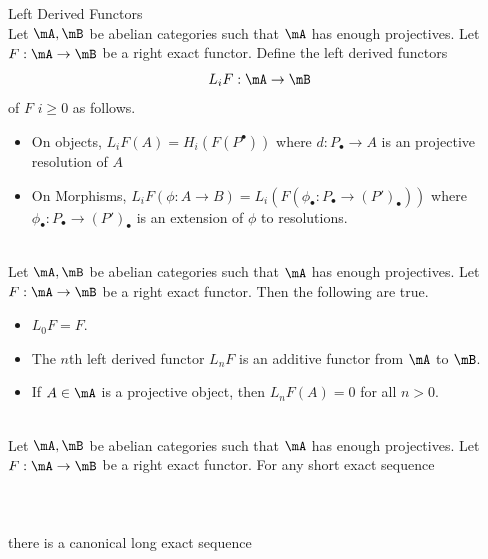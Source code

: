 \documentclass[a4paper]{article}
\begin{document}
\begin{defn}{Left Derived Functors}{}\\
Let $\mA,\mB$ be abelian categories such that $\mA$ has enough projectives. Let $F:\mA\to\mB$ be a right exact functor. Define the left derived functors $$L_iF:\mA\to\mB$$ of $F$ $i\geq 0$ as follows. 
\begin{itemize}
\item On objects, $L_iF(A)=H_i(F(P^\bullet))$ where $d:P_\bullet\to A$ is an projective resolution of $A$
\item On Morphisms, $L_iF(\phi:A\to B)=L_i(F(\phi_\bullet:P_\bullet\to (P')_\bullet))$ where $\phi_\bullet:P_\bullet\to(P')_\bullet$ is an extension of $\phi$ to resolutions. 
\end{itemize}
\end{defn}

\begin{prp}{}{}\\
Let $\mA,\mB$ be abelian categories such that $\mA$ has enough projectives. Let $F:\mA\to\mB$ be a right exact functor. Then the following are true. 
\begin{itemize}
\item $L_0F=F$. 
\item The $n$th left derived functor $L_nF$ is an additive functor from $\mA$ to $\mB$. 
\item If $A\in\mA$ is a projective object, then $L_nF(A)=0$ for all $n>0$. 
\end{itemize}
\end{prp}

\begin{prp}{}{}\\
Let $\mA,\mB$ be abelian categories such that $\mA$ has enough projectives. Let $F:\mA\to\mB$ be a right exact functor. For any short exact sequence \\~\\
\\~\\
there is a canonical long exact sequence \\~\\
\\~\\
\end{prp}
\end{document}
